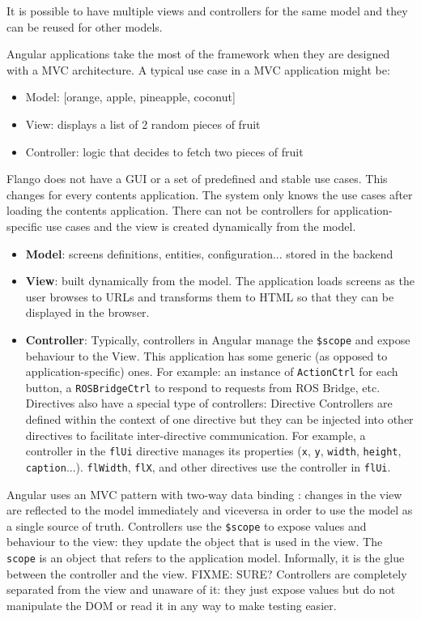It is possible to have multiple views and controllers for the same model and they can be reused for other models.

Angular applications take the most of the framework when they are designed with a \ac{MVC} architecture.
A typical use case in a \ac{MVC} application might be:
\begin{itemize}
    \item Model: [orange, apple, pineapple, coconut]
    \item View: displays a list of 2 random pieces of fruit
    \item Controller: logic that decides to fetch two pieces of fruit
\end{itemize}

Flango \cm does not have a \ac{GUI} or a set of predefined and stable use cases.
This changes for every contents application.
The system only knows the use cases after loading the contents application.
There can not be controllers for application-specific use cases and the view is created dynamically from the model.

\begin{itemize}
    \item \textbf{Model}: screens definitions, entities, configuration... stored in the backend
    \item \textbf{View}: built dynamically from the model. The application loads screens as the user browses to \ac{URL}s and transforms them to \ac{HTML} so that they can be displayed in the browser.
    \item \textbf{Controller}: Typically, controllers in Angular manage the \texttt{\$scope} and expose behaviour to the View. This application has some generic (as opposed to application-specific) ones. For example: an instance of \texttt{ActionCtrl} for each button, a \texttt{ROSBridgeCtrl} to respond to requests from ROS Bridge, etc. Directives also have a special type of controllers: Directive Controllers are defined within the context of one directive but they can be injected into other directives to facilitate inter-directive communication. For example, a controller in the \texttt{flUi} directive manages its properties (\texttt{x}, \texttt{y}, \texttt{width}, \texttt{height}, \texttt{caption}...). \texttt{flWidth}, \texttt{flX}, and other directives use the controller in \texttt{flUi}.
\end{itemize}

Angular uses an \ac{MVC} pattern with two-way data binding : changes in the view are reflected to the model immediately and viceversa in order to use the model as a single source of truth.
Controllers use the \texttt{\$scope} to expose values and behaviour to the view: they update the object that is used in the view.
The \texttt{scope} is an object that refers to the application model.
Informally, it is the glue between the controller and the view.
FIXME: SURE? Controllers are completely separated from the view and unaware of it: they just expose values but do not manipulate the \ac{DOM} or read it in any way to make testing easier.

